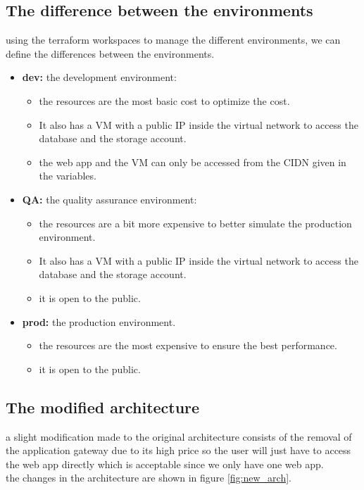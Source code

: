 \subsection{The difference between the environments} 
using the terraform workspaces to manage the different environments, we can define the differences between the environments.
\begin{itemize}
    \item \textbf{dev:} the development environment:
          \begin{itemize}
              \item the resources are the most basic cost to optimize the cost.
              \item It also has a VM with a public IP inside the virtual network to access the database and the storage account.
              \item the web app and the VM can only be accessed from the CIDN given in the variables.
          \end{itemize}
    \item \textbf{QA:} the quality assurance environment:
          \begin{itemize}
              \item the resources are a bit more expensive to better simulate the production environment.
              \item It also has a VM with a public IP inside the virtual network to access the database and the storage account.
              \item it is open to the public.
          \end{itemize}
    \item \textbf{prod:} the production environment.
          \begin{itemize}
              \item the resources are the most expensive to ensure the best performance.
              \item it is open to the public.
          \end{itemize}
\end{itemize}


\subsection{The modified architecture}
a slight modification made to the original architecture consists of the removal of the application gateway due to its high price so the user will just have to access the web app directly which is acceptable since we only have one web app.
\\ the changes in the architecture are shown in figure \ref{fig:new_arch}.

